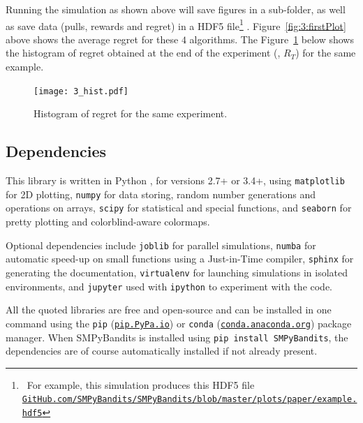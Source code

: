 Running the simulation as shown above will save figures in a sub-folder, as well as save data (pulls, rewards and regret) in a HDF5 file\footnote{~For example, this simulation produces this HDF5 file\\\texttt{\href{https://github.com/SMPyBandits/SMPyBandits/blob/master/plots/paper/example.hdf5}{GitHub.com/SMPyBandits/SMPyBandits/blob/master/plots/paper/example.hdf5}}}
\cite{h5py}.
Figure~\ref{fig:3:firstPlot} above shows the average regret for these $4$ algorithms.
The Figure~\ref{fig:3:firstPlot_hist} below shows the histogram of regret obtained at the end of the experiment (\ie, $R_T$) for the same example.

\begin{figure}[h!]  %
	\texttt{[image: 3\_hist.pdf]}
	\caption{Histogram of regret for the same experiment.}
	\label{fig:3:firstPlot_hist}
\end{figure}


\subsection{Dependencies}

This library is written in Python \cite{python}, for versions 2.7+ or 3.4+, using \texttt{matplotlib} \cite{matplotlib} for 2D plotting, \texttt{numpy} \cite{numpy} for data storing, random number generations and operations on arrays, \texttt{scipy} \cite{scipy} for statistical and special functions, and \texttt{seaborn} \cite{seaborn} for pretty plotting and colorblind-aware colormaps.

Optional dependencies include \texttt{joblib} \cite{joblib} for parallel simulations, \texttt{numba} \cite{numba} for automatic speed-up on small functions using a Just-in-Time compiler, \texttt{sphinx} \cite{sphinx} for generating the documentation, \texttt{virtualenv} \cite{virtualenv} for launching simulations in isolated environments, and \texttt{jupyter} \cite{jupyter} used with \texttt{ipython} \cite{ipython} to experiment with the code.

All the quoted libraries are free and open-source and can be installed in one command using the \texttt{pip} (\texttt{\href{https://pip.pypa.io/}{pip.PyPa.io}}) or \texttt{conda} (\texttt{\href{http://conda.anaconda.org/}{conda.anaconda.org}}) package manager.
%
When SMPyBandits is installed using \texttt{pip install SMPyBandits}, the dependencies are of course automatically installed if not already present.


